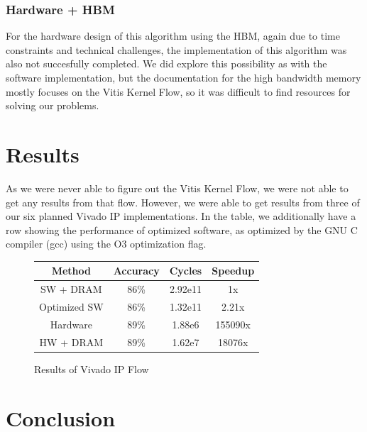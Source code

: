 \documentclass[11pt, final, conference, letterpaper, twocolumn]{IEEEtran}[2015/08/26]
\begin{document}
\subsubsection{Hardware + HBM}

For the hardware design of this algorithm using the HBM, again due to time constraints and technical challenges, the implementation of this algorithm was also not succesfully completed. We did explore this possibility as with the software implementation, but the documentation for the high bandwidth memory mostly focuses on the Vitis Kernel Flow, so it was difficult to find resources for solving our problems.

\section{Results}
\label{sec:results}

As we were never able to figure out the Vitis Kernel Flow, we were not able to get any results from that flow. However, we were able to get results from three of our six planned Vivado IP implementations. In the table, we additionally have a row showing the performance of optimized software, as optimized by the GNU C compiler (gcc) using the O3 optimization flag.

\begin{figure}
  \centering
  \begin{tabular}{c|ccc}
    \toprule
    Method       & Accuracy & Cycles  & Speedup \\
    \midrule
    SW + DRAM    & 86\%     & 2.92e11 & 1x      \\
    Optimized SW & 86\%     & 1.32e11 & 2.21x   \\
    Hardware     & 89\%     & 1.88e6  & 155090x \\
    HW + DRAM    & 89\%     & 1.62e7  & 18076x  \\
    \bottomrule
  \end{tabular}
  \caption{Results of Vivado IP Flow}
  \label{tab:ex:cref}
\end{figure}

\section{Conclusion}
\label{sec:conclusion}
\end{document}
